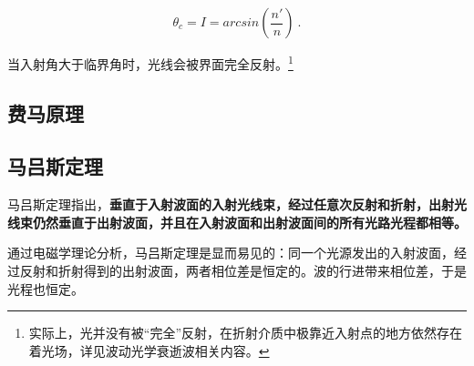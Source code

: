 \begin{equation}
\theta _c=I=arcsin(\frac{n'}{n}) ~.
\end{equation}

当入射角大于临界角时，光线会被界面完全反射。\footnote{实际上，光并没有被“完全”反射，在折射介质中极靠近入射点的地方依然存在着光场，详见波动光学衰逝波相关内容。}

\subsection{费马原理}

\subsection{马吕斯定理}

马吕斯定理指出，\textbf{垂直于入射波面的入射光线束，经过任意次反射和折射，出射光线束仍然垂直于出射波面，并且在入射波面和出射波面间的所有光路光程都相等。}

通过电磁学理论分析，马吕斯定理是显而易见的：同一个光源发出的入射波面，经过反射和折射得到的出射波面，两者相位差是恒定的。波的行进带来相位差，于是光程也恒定。
